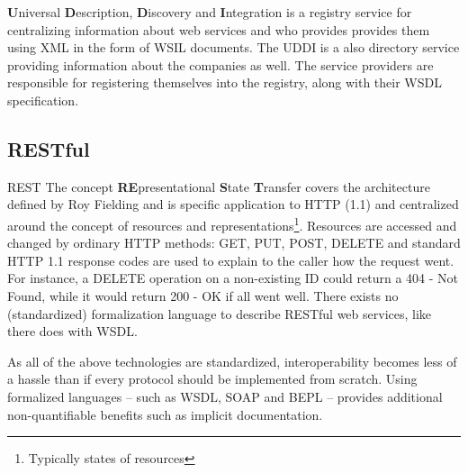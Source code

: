 \textbf{U}niversal \textbf{D}escription, \textbf{D}iscovery and \textbf{I}ntegration is a registry service for centralizing information about web services and who provides provides them using XML in the form of WSIL documents. The UDDI is a also directory service providing information about the companies as well. The service providers are responsible for registering themselves into the registry, along with their WSDL specification.

\subsection{RESTful}
REST The concept \textbf{RE}presentational \textbf{S}tate \textbf{T}ransfer covers the architecture defined by Roy Fielding and is specific application to HTTP (1.1) and centralized around the concept of resources and representations\footnote{Typically states of resources}. Resources are accessed and changed by ordinary HTTP methods: GET, PUT, POST, DELETE and standard HTTP 1.1 response codes are used to explain to the caller how the request went. For instance, a DELETE operation on a non-existing ID could return a 404 - Not Found, while it would return 200 - OK if all went well. There exists no (standardized) formalization language to describe RESTful web services, like there does with WSDL.



As all of the above technologies are standardized, interoperability becomes less of a hassle than if every protocol should be implemented from scratch. Using formalized languages -- such as WSDL, SOAP and BEPL -- provides additional non-quantifiable benefits such as implicit documentation.